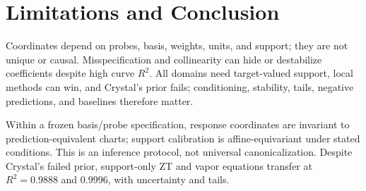 \section{Limitations and Conclusion}
\label{sec:conclusion}

Coordinates depend on probes, basis, weights, units, and support; they are not
unique or causal.  Misspecification and collinearity can hide or destabilize
coefficients despite high curve $R^2$.  All domains need target-valued support,
local methods can win, and Crystal's prior fails; conditioning, stability,
tails, negative predictions, and baselines therefore matter.

Within a frozen basis/probe specification, response coordinates are invariant
to prediction-equivalent charts; support calibration is affine-equivariant under
stated conditions.  This is an inference protocol, not universal canonicalization.
Despite Crystal's failed prior, support-only ZT and vapor equations transfer at
$R^2=0.9888$ and $0.9996$, with uncertainty and tails.

